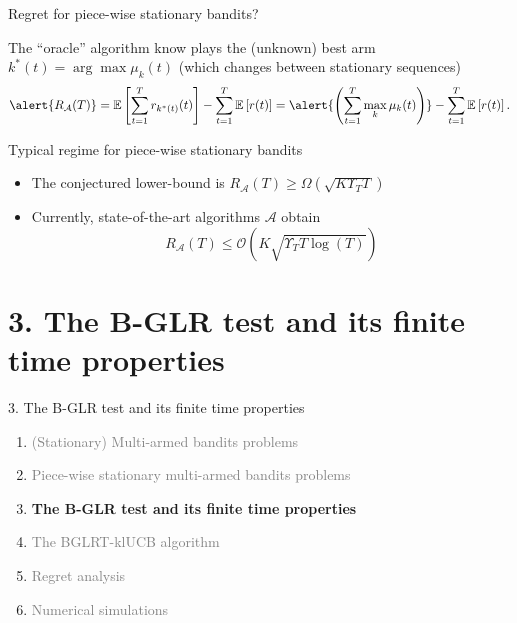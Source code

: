 \documentclass[11pt,english,ignorenonframetext,]{beamer}
\begin{document}
\begin{frame}{Regret for piece-wise stationary bandits?}

  The ``oracle'' algorithm know plays the (unknown) best arm $k^*(t) = \arg\max \mu_k(t)$
  (which changes between stationary sequences)
  \[ \alert{ R_{\mathcal{A}}(T) } = \mathbb{E}\left[ \sum\limits_{t=1}^T r_{k^*(t)}(t) \right] - \sum\limits_{t=1}^T \mathbb{E}\left[ r(t) \right] = \alert{\left(\sum_{t=1}^T \max_k \mu_k(t) \right)} - \sum\limits_{t=1}^T \mathbb{E}\left[ r(t) \right]. \]

\pause
\vspace*{10pt}

\begin{exampleblock}{Typical regime for piece-wise stationary bandits}
  \begin{itemize}
  \item
  The conjectured lower-bound is
  $R_{\mathcal{A}}(T) \geq \Omega(\sqrt{K \Upsilon_T T})$

  \item
  Currently, state-of-the-art algorithms $\mathcal{A}$ obtain
  \[ R_{\mathcal{A}}(T) \leq \mathcal{O}(K \sqrt{\Upsilon_T T \log(T)}) \]
  \end{itemize}
\end{exampleblock}

\end{frame}


\section{\hfill{}3. The B-GLR test and its finite time properties\hfill{}}

\begin{frame}{3. The B-GLR test and its finite time properties}

  \begin{enumerate}
    \item
    \textcolor{gray}{
      (Stationary) Multi-armed bandits problems
    }
    \vspace*{15pt}

    \item
    \textcolor{gray}{
      Piece-wise stationary multi-armed bandits problems
    }
    \vspace*{15pt}

    \item
    \alert{\textbf{%
      The B-GLR test and its finite time properties
    }}
    \vspace*{15pt}

    \item
    \textcolor{gray}{
      The BGLRT-klUCB algorithm
    }
    \vspace*{15pt}

    \item
    \textcolor{gray}{
      Regret analysis
    }
    \vspace*{15pt}

    \item
    \textcolor{gray}{
      Numerical simulations
    }
  \end{enumerate}

\end{frame}
\end{document}
